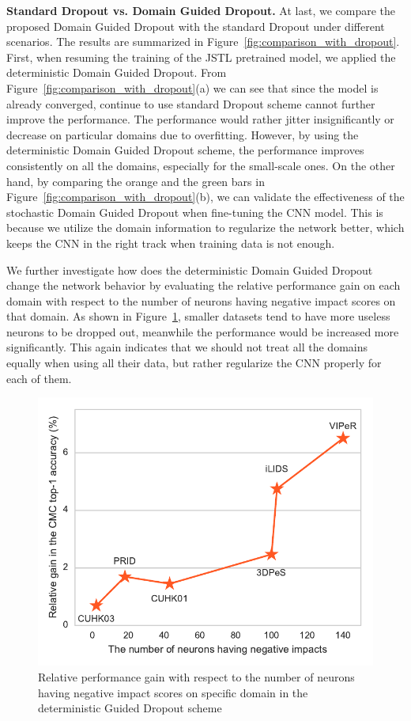 \textbf{Standard Dropout vs. Domain Guided Dropout.} At last, we compare the proposed Domain Guided Dropout with the standard Dropout under different scenarios. The results are summarized in Figure~\ref{fig:comparison_with_dropout}. First, when resuming the training of the JSTL pretrained model, we applied the deterministic Domain Guided Dropout. From Figure~\ref{fig:comparison_with_dropout}(a) we can see that since the model is already converged, continue to use standard Dropout scheme cannot further improve the performance. The performance would rather jitter insignificantly or decrease on particular domains due to overfitting. However, by using the deterministic Domain Guided Dropout scheme, the performance improves consistently on all the domains, especially for the small-scale ones. On the other hand, by comparing the orange and the green bars in Figure~\ref{fig:comparison_with_dropout}(b), we can validate the effectiveness of the stochastic Domain Guided Dropout when fine-tuning the CNN model. This is because we utilize the domain information to regularize the network better, which keeps the CNN in the right track when training data is not enough.

We further investigate how does the deterministic Domain Guided Dropout change the network behavior by evaluating the relative performance gain on each domain with respect to the number of neurons having negative impact scores on that domain. As shown in Figure~\ref{fig:gain_wrt_neg_neurons}, smaller datasets tend to have more useless neurons to be dropped out, meanwhile the performance would be increased more significantly. This again indicates that we should not treat all the domains equally when using all their data, but rather regularize the CNN properly for each of them.

\begin{figure}[t]
\begin{center}
\includegraphics[width=1.0\linewidth]{figures/multi_domain/gain_wrt_neg_neurons.pdf}
\end{center}
\caption{Relative performance gain with respect to the number of neurons having negative impact scores on specific domain in the deterministic Guided Dropout scheme}
\label{fig:gain_wrt_neg_neurons}
\end{figure}


